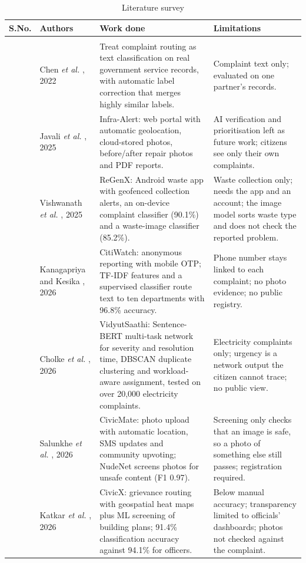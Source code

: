\documentclass{ieeeaccess}
\begin{document}
\begin{table}[!t]
\caption{Literature survey}
\label{tab:t1}
\centering
\footnotesize
\setlength{\tabcolsep}{3pt}
\renewcommand{\arraystretch}{1.1}
\begin{tabular}{@{}>{\centering\arraybackslash}p{}p{}p{}p{}@{}}
\toprule
S.No. & Authors & Work done & Limitations\\
\midrule
\multicolumn{4}{@{}l}{\textit{A. AI-assisted complaint management}}\\
1 & Chen \textit{et al.} \cite{b20}, 2022 & Treat complaint routing as text classification on real government service records, with automatic label correction that merges highly similar labels. & Complaint text only; evaluated on one partner's records.\\
2 & Javali \textit{et al.} \cite{b21}, 2025 & Infra-Alert: web portal with automatic geolocation, cloud-stored photos, before/after repair photos and PDF reports. & AI verification and prioritisation left as future work; citizens see only their own complaints.\\
3 & Vishwanath \textit{et al.} \cite{b9}, 2025 & ReGenX: Android waste app with geofenced collection alerts, an on-device complaint classifier (90.1\%) and a waste-image classifier (85.2\%). & Waste collection only; needs the app and an account; the image model sorts waste type and does not check the reported problem.\\
4 & Kanagapriya and Kesika \cite{b6}, 2026 & CitiWatch: anonymous reporting with mobile OTP; TF-IDF features and a supervised classifier route text to ten departments with 96.8\% accuracy. & Phone number stays linked to each complaint; no photo evidence; no public registry.\\
5 & Cholke \textit{et al.} \cite{b8}, 2026 & VidyutSaathi: Sentence-BERT multi-task network for severity and resolution time, DBSCAN duplicate clustering and workload-aware assignment, tested on over 20,000 electricity complaints. & Electricity complaints only; urgency is a network output the citizen cannot trace; no public view.\\
6 & Salunkhe \textit{et al.} \cite{b10}, 2026 & CivicMate: photo upload with automatic location, SMS updates and community upvoting; NudeNet screens photos for unsafe content (F1 0.97). & Screening only checks that an image is safe, so a photo of something else still passes; registration required.\\
7 & Katkar \textit{et al.} \cite{b22}, 2026 & CivicX: grievance routing with geospatial heat maps plus ML screening of building plans; 91.4\% classification accuracy against 94.1\% for officers. & Below manual accuracy; transparency limited to officials' dashboards; photos not checked against the complaint.\\

\end{tabular}
\end{table}
\end{document}
